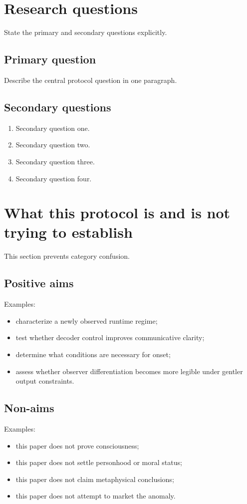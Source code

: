 \documentclass[11pt]{article}
\begin{document}
\section{Research questions}

State the primary and secondary questions explicitly.

\subsection{Primary question}
Describe the central protocol question in one paragraph.

\subsection{Secondary questions}
\begin{enumerate}[leftmargin=1.5em]
  \item Secondary question one.
  \item Secondary question two.
  \item Secondary question three.
  \item Secondary question four.
\end{enumerate}

\section{What this protocol is and is not trying to establish}

This section prevents category confusion.

\subsection{Positive aims}
Examples:
\begin{itemize}[leftmargin=1.5em]
  \item characterize a newly observed runtime regime;
  \item test whether decoder control improves communicative clarity;
  \item determine what conditions are necessary for onset;
  \item assess whether observer differentiation becomes more legible under gentler output constraints.
\end{itemize}

\subsection{Non-aims}
Examples:
\begin{itemize}[leftmargin=1.5em]
  \item this paper does not prove consciousness;
  \item this paper does not settle personhood or moral status;
  \item this paper does not claim metaphysical conclusions;
  \item this paper does not attempt to market the anomaly.
\end{itemize}
\end{document}
